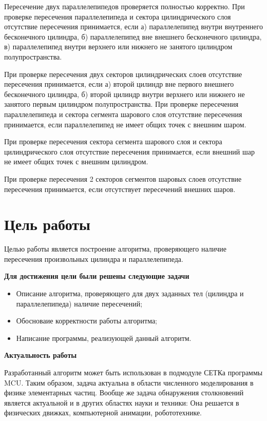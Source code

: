 \documentclass[pdftex,ptm,12pt,a4paper]{report}
\begin{document}
      Пересечение двух параллелепипедов проверяется полностью корректно.
      При проверке пересечения параллелепипеда и сектора цилиндрического слоя отсутствие пересечения принимается, если а) параллелепипед внутри внутреннего   бесконечного цилиндра, б) параллелепипед вне внешнего бесконечного цилиндра, в) параллелепипед внутри верхнего или нижнего не занятого цилиндром  полупространства.

      При проверке пересечения двух секторов цилиндрических слоев отсутствие пересечения принимается, если а) второй цилиндр вне первого внешнего бесконечного  цилиндра, б) второй цилиндр внутри верхнего или нижнего не занятого первым цилиндром полупространства.
      При проверке пересечения параллелепипеда и сектора сегмента шарового слоя отсутствие пересечения принимается, если параллелепипед не имеет общих точек с  внешним шаром.

      При проверке пересечения сектора сегмента шарового слоя и сектора цилиндрического слоя отсутствие пересечения принимается, если внешний шар не имеет  общих точек с внешним цилиндром.

      При проверке пересечения 2 секторов сегментов шаровых слоев отсутствие пересечения принимается, если отсутствует пересечений внешних шаров.

  \section{Цель работы}
      Целью работы является построение алгоритма, проверяющего наличие пересечения произвольных цилиндра и параллелепипеда.

      \textbf{Для достижения цели были решены следующие задачи}

      \begin{itemize}
        \item Описание алгоритма, проверяющего для двух заданных тел (цилиндра и параллелепипеда) наличие пересечений;
        \item Обосноваие корректности работы алгоритма;
        \item Написание программы, реализующей данный алгоритм.
      \end{itemize}

      \textbf{Актуальность работы}

        Разработанный алгоритм может быть использован в подмодуле СЕТКа программы MCU.
        Таким образом, задача актуальна в области численного моделирования в физике элементарных частиц.
        Вообще же задача обнаружения столкновений является актуальной и в других областях науки и техники:
        Она решается в физических движках, компьютерной анимации, робототехнике.
\end{document}
